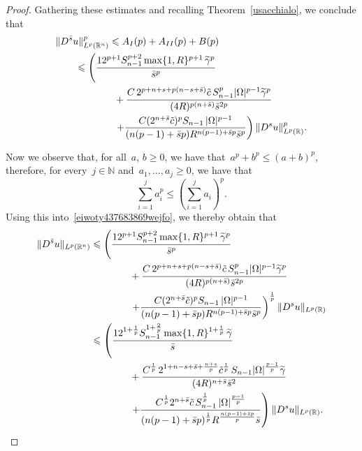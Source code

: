 \documentclass[11pt,hyp,]{nyjm}
\numberwithin{equation}{section}
\newcommand{\R}{\mathbb{R}}
\newcommand{\N}{\mathbb{N}}
\theoremstyle{remark}
\newcommand{\bs}{\Bar{s}}
\renewcommand{\le}{\leqslant}
\renewcommand{\ge}{\geqslant}
\begin{document}
\begin{proof}
Gathering these estimates and recalling
Theorem~\ref{usacchialo}, we conclude that
\begin{equation}\label{eiwoty437683869wejfo}\begin{split}&
\Vert D^{\bs} u \Vert^p_{L^p(\R^n)} \le A_{I}(p) + A_{II}(p) + B(p)\\
&\qquad \le\left(
\frac{12^{p+1} S_{n-1}^{p+2} \max\{1,R\}^{p+1}\,\widetilde\gamma^p}{\bar{s}^p}\right.\\&\qquad\qquad\qquad
+\frac{C\,2^{p+n+s+p(n-s+\bar s)} \Tilde{c}\,S_{n-1}^p|\Omega|^{p-1}\widetilde\gamma^p}{(4R)^{p(n+\bar s)}\bar{s}^{2p}}\\ &\qquad\qquad\qquad \left. 
+\frac{C(2^{n+ \bar{s}} \Tilde{c})^p S_{n-1}\,|\Omega|^{p-1} }{(n(p-1)+ \bar{s}p) R^{n(p-1)+ \bar{s}p}\bar{s}^p} \right) \Vert D^s u \Vert^p_{L^p(\R)}.
\end{split}\end{equation}

Now we observe that, for all~$a$, $b\ge0$, we have that~$a^p+b^p\le(a+b)^p$, therefore,
for every~$j\in\N$ and~$a_1,\dots, a_j\ge0$, we have that
$$ \sum_{i=1}^j a_i^p\le \left( \sum_{i=1}^j a_i\right)^p.$$
Using this into~\eqref{eiwoty437683869wejfo}, we thereby obtain that
\begin{equation}\label{dewiosdvjt473kipipoiupuoy}\begin{split}
\Vert D^{\bs} u \Vert_{L^p(\R^n)}& \le\left(
\frac{12^{p+1} S_{n-1}^{p+2} \max\{1,R\}^{p+1}\,\widetilde\gamma^p}{\bar{s}^p}\right.\\ &\qquad \qquad
+\frac{C\,2^{p+n+s+p(n-s+\bar s)} \Tilde{c}\,S_{n-1}^p|\Omega|^{p-1}\widetilde\gamma^p}{(4R)^{p(n+\bar s)}\bar{s}^{2p}}\\ &\qquad\qquad \left. 
+\frac{C(2^{n+ \bar{s}} \Tilde{c})^p S_{n-1}\,|\Omega|^{p-1} }{(n(p-1)+ \bar{s}p) R^{n(p-1)+ \bar{s}p}\bar{s}^p} \right)^{\frac1p} \Vert D^s u \Vert_{L^p(\R)}\\
&\le\left(
\frac{12^{1+\frac1p} S_{n-1}^{1+\frac2p} \max\{1,R\}^{1+\frac1p}\,\widetilde\gamma}{\bar{s}}\right.\\ &\qquad \qquad
+\frac{C^{\frac1p}\,2^{1+n-s+\bar s+\frac{n+s}p} \Tilde{c}^{\frac1p}\,S_{n-1}|\Omega|^{\frac{p-1}p}\widetilde\gamma}{(4R)^{n+\bar s}\bar{s}^{2}}\\ &\qquad \qquad \left. 
+\frac{C^{\frac1p} 2^{n+ \bar{s}} \Tilde{c}\, S_{n-1}^{\frac1p}\,|\Omega|^{\frac{p-1}p} }{(n(p-1)+ \bar{s}p)^{\frac1p} R^{\frac{n(p-1)+ \bar{s}p}p}\bar{s}} \right) \Vert D^s u \Vert_{L^p(\R)}
.\end{split}\end{equation}


\end{proof}
\end{document}
